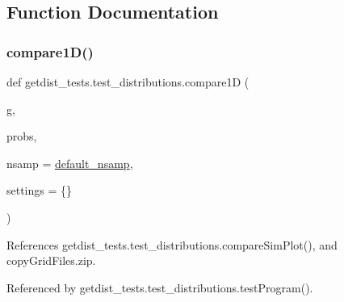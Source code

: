 \subsection{Function Documentation}
\mbox{\label{namespacegetdist__tests_1_1test__distributions_a58a3396fc92c2a94495d2f7f5a7afbb7}} 
\subsubsection{\texorpdfstring{compare1\+D()}{compare1D()}}
{\footnotesize\ttfamily def getdist\+\_\+tests.\+test\+\_\+distributions.\+compare1D (\begin{DoxyParamCaption}\item[{}]{g,  }\item[{}]{probs,  }\item[{}]{nsamp = {\ttfamily \mbox{\hyperlink{namespacegetdist__tests_1_1test__distributions_af66b4064706bf88e0ed5378ff868fc39}{default\+\_\+nsamp}}},  }\item[{}]{settings = {\ttfamily \{\}} }\end{DoxyParamCaption})}



References getdist\+\_\+tests.\+test\+\_\+distributions.\+compare\+Sim\+Plot(), and copy\+Grid\+Files.\+zip.



Referenced by getdist\+\_\+tests.\+test\+\_\+distributions.\+test\+Program().

